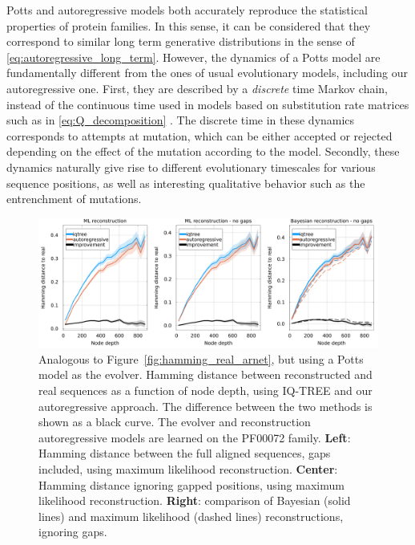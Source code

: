 Potts and autoregressive models both accurately reproduce the statistical properties of protein families. 
In this sense, it can be considered that they correspond to similar long term generative distributions in the sense of \eqref{eq:autoregressive_long_term}. 
However, the dynamics of a Potts model are fundamentally different from the ones of usual evolutionary models, including our autoregressive one. 
First, they are described by a \emph{discrete} time Markov chain, instead of the continuous time used in models based on substitution rate matrices such as in \eqref{eq:Q_decomposition} \cite{alvarez_vivofunctionalphenotypes_2024}. 
The discrete time in these dynamics corresponds to attempts at mutation, which can be either accepted or rejected depending on the effect of the mutation according to the model. 
Secondly, these dynamics naturally give rise to different evolutionary timescales for various sequence positions, as well as interesting qualitative behavior such as the entrenchment of mutations. 


\begin{figure}
	\centering
	\includegraphics[width = \textwidth]{figures/hamming_to_real_potts_PF00072.png}
	\caption{
		Analogous to Figure~\ref{fig:hamming_real_arnet}, but using a Potts model as the evolver. 
		Hamming distance between reconstructed and real sequences as a function of node depth, using IQ-TREE and our autoregressive approach. 
		The difference between the two methods is shown as a black curve. 
		The evolver and reconstruction autoregressive models are learned on the PF00072 family. 
		\textbf{Left}: Hamming distance between the full aligned sequences, gaps included, using maximum likelihood reconstruction.  	
		\textbf{Center}: Hamming distance ignoring gapped positions, using maximum likelihood reconstruction. 
		\textbf{Right}: comparison of Bayesian (solid lines) and maximum likelihood (dashed lines) reconstructions, ignoring gaps. 
	}
	\label{fig:hamming_real_potts}
\end{figure}

